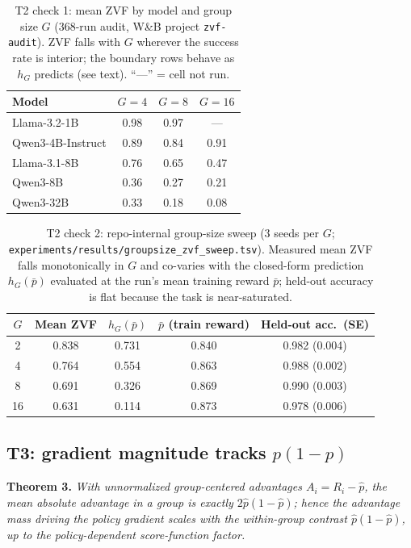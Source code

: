 \documentclass{article}
\begin{document}
\begin{table}[t]
\centering
\caption{T2 check 1: mean ZVF by model and group size $G$ (368-run audit,
W\&B project \texttt{zvf-audit}). ZVF falls with $G$ wherever the success
rate is interior; the boundary rows behave as $h_G$ predicts (see text).
``---'' = cell not run.}
\label{tab:p7-modelG}
\begin{tabular}{lccc}
\toprule
Model & $G{=}4$ & $G{=}8$ & $G{=}16$ \\
\midrule
Llama-3.2-1B        & 0.98 & 0.97 & --- \\
Qwen3-4B-Instruct   & 0.89 & 0.84 & 0.91 \\
Llama-3.1-8B        & 0.76 & 0.65 & 0.47 \\
Qwen3-8B            & 0.36 & 0.27 & 0.21 \\
Qwen3-32B           & 0.33 & 0.18 & 0.08 \\
\bottomrule
\end{tabular}
\end{table}

\begin{table}[t]
\centering
\caption{T2 check 2: repo-internal group-size sweep (3 seeds per $G$;
\texttt{experiments/results/groupsize\_zvf\_sweep.tsv}). Measured mean ZVF
falls monotonically in $G$ and co-varies with the closed-form prediction
$h_G(\bar p)$ evaluated at the run's mean training reward $\bar p$; held-out
accuracy is flat because the task is near-saturated.}
\label{tab:p7-gsweep}
\begin{tabular}{ccccc}
\toprule
$G$ & Mean ZVF & $h_G(\bar p)$ & $\bar p$ (train reward) & Held-out acc.\ (SE) \\
\midrule
2  & 0.838 & 0.731 & 0.840 & 0.982 (0.004) \\
4  & 0.764 & 0.554 & 0.863 & 0.988 (0.002) \\
8  & 0.691 & 0.326 & 0.869 & 0.990 (0.003) \\
16 & 0.631 & 0.114 & 0.873 & 0.978 (0.006) \\
\bottomrule
\end{tabular}
\end{table}

\subsection{T3: gradient magnitude tracks $p(1-p)$}
\label{sec:p7-t3}
\textbf{Theorem 3.} \emph{With unnormalized group-centered advantages
$A_i = R_i - \hat p$, the mean absolute advantage in a group is exactly
$2\hat p(1 - \hat p)$; hence the advantage mass driving the policy gradient
scales with the within-group contrast $\hat p(1-\hat p)$, up to the
policy-dependent score-function factor.}
\end{document}

